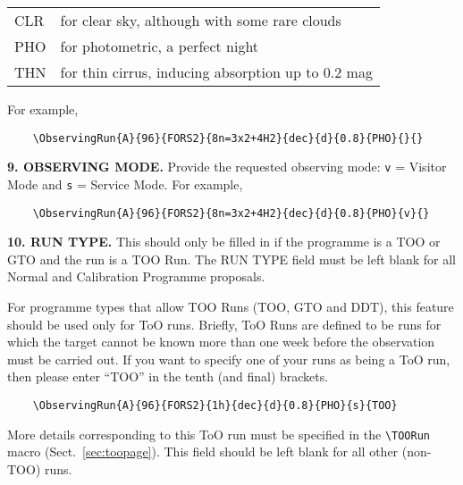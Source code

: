 \documentclass{article}
\begin{document}
\smallskip

\begin{tabular}{ll}
  CLR & for clear sky, although with some rare clouds \\
  PHO & for photometric, a perfect night \\
  THN & for thin cirrus, inducing absorption up to 0.2 mag \\
\end{tabular}

\smallskip

For example, 
\begin{verbatim}
    \ObservingRun{A}{96}{FORS2}{8n=3x2+4H2}{dec}{d}{0.8}{PHO}{}{}
\end{verbatim}

\medskip

{\bf 9.  OBSERVING MODE.} Provide the requested observing mode:
\verb|v| = Visitor Mode and \verb|s| = Service Mode. For example,
\begin{verbatim}
    \ObservingRun{A}{96}{FORS2}{8n=3x2+4H2}{dec}{d}{0.8}{PHO}{v}{}
\end{verbatim}

{\bf 10.  RUN TYPE.}
This should only be filled in if the programme is a TOO or GTO 
and the run is a TOO Run.  The RUN TYPE field must be left blank 
for all Normal and Calibration Programme proposals.

For programme types that allow TOO Runs (TOO, GTO and DDT), this feature
should be used only for ToO runs.
Briefly, ToO Runs are defined to be runs for which the target cannot be known more than
one week before the observation must be carried out.
If you want to specify one of your runs 
as being a ToO run, then please enter ``TOO'' in the tenth (and final) brackets.

\begin{verbatim}
    \ObservingRun{A}{96}{FORS2}{1h}{dec}{d}{0.8}{PHO}{s}{TOO}
\end{verbatim}

More details corresponding to this ToO run must be specified in the
\verb|\TOORun| macro (Sect.~\ref{sec:toopage}).
This field should be left blank for all other (non-TOO) runs.
\end{document}
